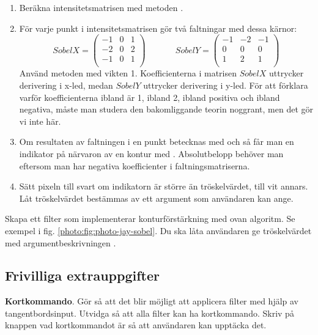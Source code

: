 \begin{enumerate}
	\item Beräkna intensitetsmatrisen med metoden .
	\item För varje punkt i intensitetsmatrisen gör två faltningar med dessa kärnor:
$$
SobelX =
\begin{pmatrix}
  -1 & 0 & 1 \\
  -2 & 0 & 2 \\
  -1 & 0 & 1 \\
\end{pmatrix}
~\hspace{3em}~
SobelY =
\begin{pmatrix}
  -1 & -2 & -1 \\
  0 & 0 & 0 \\
  1 & 2 & 1 \\
\end{pmatrix}
$$
	Använd metoden  med vikten 1. Koefficienterna i matrisen $SobelX$ uttrycker derivering i x-led, medan $SobelY$ uttrycker derivering i y-led. För att förklara varför koefficienterna ibland är 1, ibland 2, ibland positiva och ibland negativa, måste man studera den bakomliggande teorin noggrant, men det gör vi inte här.
	\item Om resultaten av faltningen i en punkt betecknas med  och  så får man en indikator på närvaron av en kontur med . Absolutbelopp behöver man eftersom man har negativa koefficienter i faltningsmatriserna.
	\item  Sätt pixeln till svart om indikatorn är större än tröskelvärdet, till vit annars. Låt tröskelvärdet bestämmas av ett argument som användaren kan ange.
\end{enumerate}
\noindent Skapa ett filter  som implementerar konturförstärkning med ovan algoritm. Se exempel i fig. \ref{photo:fig:photo-jay-sobel}. Du ska låta användaren ge tröskelvärdet med argumentbeskrivningen .


\Task 

\subsection{Frivilliga extrauppgifter}

\Task \textbf{Kortkommando}. Gör så att det blir möjligt att applicera filter med hjälp av tangentbordsinput. Utvidga  så att alla filter kan ha kortkommando. Skriv på knappen vad kortkommandot är så att användaren kan upptäcka det.

